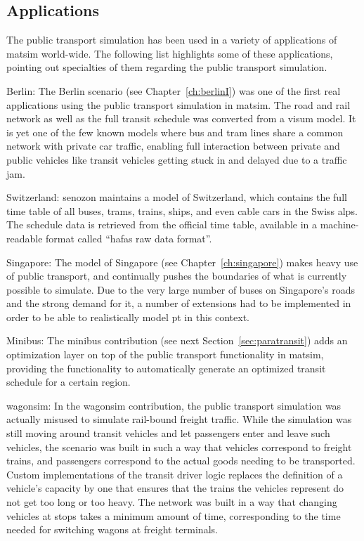 \subsection{Applications}
The public transport simulation has been used in a variety of applications of
\gls{matsim} world-wide. The following list highlights some of these applications,
pointing out specialties of them regarding the public transport simulation.

\begin{compactitem}
	\item Berlin: The Berlin scenario (see Chapter~\ref{ch:berlinI}) was one of
	the first real applications using the public transport simulation in \gls{matsim}.
	The road and rail network as well as the full transit schedule was converted
	from a \gls{visum} model. It is yet one of the few known models where bus and tram
	lines share a common network with private car traffic, enabling full
	interaction between private and public vehicles like transit vehicles getting
	stuck in and delayed due to a traffic jam.
	\item Switzerland: \gls{senozon} maintains a model of Switzerland, which contains the
	full time table of all buses, trams, trains, ships, and even cable cars in the
	Swiss alps. The schedule data is retrieved from the official time table,
	available in a machine-readable format called ``\gls{hafas} raw data format''.
	\item Singapore: The model of Singapore (see Chapter~\ref{ch:singapore}) makes
	heavy use of public transport, and continually pushes the boundaries of what is
	currently possible to simulate. Due to the very large number of buses on
	Singapore's roads and the strong demand for it, a number of extensions had to
	be implemented in order to be able to realistically model pt in this context.
	\item Minibus: The minibus contribution (see next Section~\ref{sec:paratransit}) 
	adds an optimization layer on top of the public
	transport functionality in \gls{matsim}, providing the functionality to automatically
	generate an optimized transit schedule for a certain region.
	\item wagonsim: In the wagonsim contribution, %
	the public transport simulation was actually misused to simulate
	rail-bound freight traffic. While the simulation was still moving around
	transit vehicles and let passengers enter and leave such vehicles, the scenario
	was built in such a way that vehicles correspond to freight trains, and
	passengers correspond to the actual goods needing to be transported. Custom
	implementations of the transit driver logic replaces the definition of a
	vehicle's capacity by one that ensures that the trains the vehicles represent
	do not get too long or too heavy. The network was built in a way that changing
	vehicles at stops takes a minimum amount of time, corresponding to the time
	needed for switching wagons at freight terminals.
\end{compactitem}

